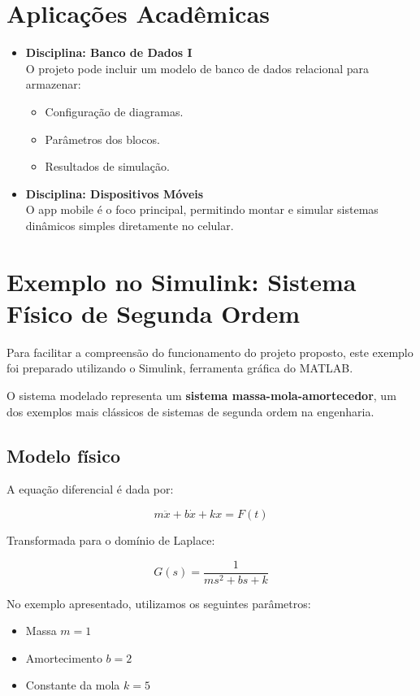 \documentclass[12pt]{article}
\begin{document}
\section*{Aplicações Acadêmicas}

\begin{itemize}
    \item \textbf{Disciplina: Banco de Dados I} \\
    O projeto pode incluir um modelo de banco de dados relacional para armazenar:
    \begin{itemize}
        \item Configuração de diagramas.
        \item Parâmetros dos blocos.
        \item Resultados de simulação.
    \end{itemize}

    \item \textbf{Disciplina: Dispositivos Móveis} \\
    O app mobile é o foco principal, permitindo montar e simular sistemas dinâmicos simples diretamente no celular.
\end{itemize}

\newpage

\section*{Exemplo no Simulink: Sistema Físico de Segunda Ordem}

Para facilitar a compreensão do funcionamento do projeto proposto, este exemplo foi preparado utilizando o Simulink, ferramenta gráfica do MATLAB.

O sistema modelado representa um \textbf{sistema massa-mola-amortecedor}, um dos exemplos mais clássicos de sistemas de segunda ordem na engenharia.

\subsection*{Modelo físico}

A equação diferencial é dada por:

\[
m \ddot{x} + b \dot{x} + kx = F(t)
\]

Transformada para o domínio de Laplace:

\[
G(s) = \frac{1}{ms^2 + bs + k}
\]

No exemplo apresentado, utilizamos os seguintes parâmetros:
\begin{itemize}
    \item Massa \( m = 1 \)
    \item Amortecimento \( b = 2 \)
    \item Constante da mola \( k = 5 \)
\end{itemize}
\end{document}
